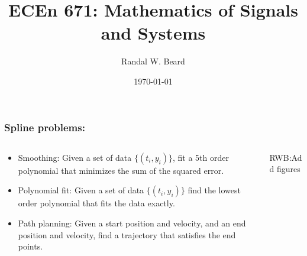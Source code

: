 \documentclass{beamer}
\title{ECEn 671: Mathematics of Signals and Systems}
\author{Randal W. Beard}
\institute{Brigham Young University}
\date{\today}
\newcommand{\rwbcomment}[1]{{\color{blue}RWB:#1}}
\begin{document}
\frame{\titlepage}

\begin{frame}
\frametitle{Spline problems:}	
\begin{columns}
\begin{column}{0.8\textwidth}
   \begin{itemize}
   \item Smoothing:  Given a set of data $\{(t_i, y_i)\}$, fit a 5th order polynomial that minimizes the sum of the squared error.
   \item Polynomial fit:  Given a set of data $\{(t_i, y_i)\}$ find the lowest order polynomial that fits the data exactly.
   \item Path planning:  Given a start position and velocity, and an end position and velocity, find a trajectory that satisfies the end points.
   \end{itemize}
\end{column}
\begin{column}{0.2\textwidth}  
	\rwbcomment{Add figures}
\end{column}
\end{columns}
\end{frame}
\end{document}
